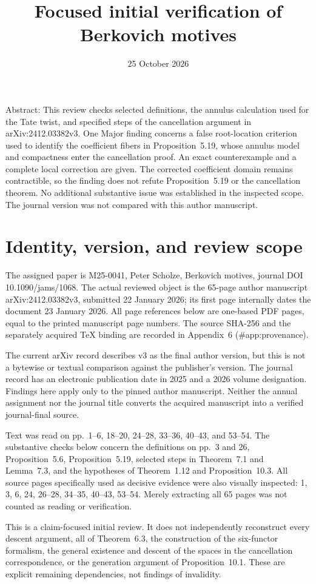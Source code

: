 \documentclass[10pt]{article}
\title{Focused initial verification of
Berkovich motives}
\author{}
\date{25 October 2026}
\begin{document}
\maketitle
Abstract: This review checks selected definitions, the annulus calculation used for the Tate twist, and specified steps of the cancellation argument in arXiv:2412.03382v3. One Major finding concerns a false root-location criterion used to identify the coefficient fibers in Proposition 5.19, whose annulus model and compactness enter the cancellation proof. An exact counterexample and a complete local correction are given. The corrected coefficient domain remains contractible, so the finding does not refute Proposition 5.19 or the cancellation theorem. No additional substantive issue was established in the inspected scope. The journal version was not compared with this author manuscript.\par
\section*{Identity, version, and review scope}
The assigned paper is M25-0041, Peter Scholze, Berkovich motives, journal DOI 10.1090/jams/1068. The actual reviewed object is the 65-page author manuscript arXiv:2412.03382v3, submitted 22 January 2026; its first page internally dates the document 23 January 2026. All page references below are one-based PDF pages, equal to the printed manuscript page numbers. The source SHA-256 and the separately acquired TeX binding are recorded in Appendix 6 (\#app:provenance).\par
The current arXiv record describes v3 as the final author version, but this is not a bytewise or textual comparison against the publisher’s version. The journal record has an electronic publication date in 2025 and a 2026 volume designation. Findings here apply only to the pinned author manuscript. Neither the annual assignment nor the journal title converts the acquired manuscript into a verified journal-final source.\par
Text was read on pp. 1–6, 18–20, 24–28, 33–36, 40–43, and 53–54. The substantive checks below concern the definitions on pp. 3 and 26, Proposition 5.6, Proposition 5.19, selected steps in Theorem 7.1 and Lemma 7.3, and the hypotheses of Theorem 1.12 and Proposition 10.3. All source pages specifically used as decisive evidence were also visually inspected: 1, 3, 6, 24, 26–28, 34–35, 40–43, 53–54. Merely extracting all 65 pages was not counted as reading or verification.\par
This is a claim-focused initial review. It does not independently reconstruct every descent argument, all of Theorem 6.3, the construction of the six-functor formalism, the general existence and descent of the spaces in the cancellation correspondence, or the generation argument of Proposition 10.1. These are explicit remaining dependencies, not findings of invalidity.\par
\end{document}
